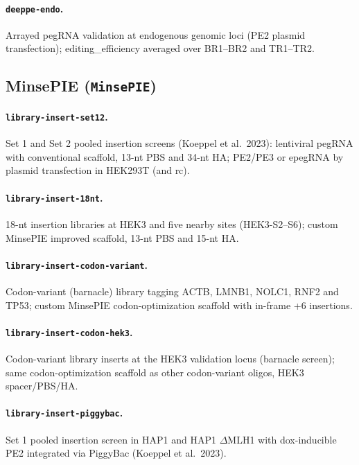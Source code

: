 \documentclass{article}
\begin{document}
\paragraph{\nolinkurl{deeppe-endo}.}
Arrayed pegRNA validation at endogenous genomic loci (PE2 plasmid transfection); editing\_efficiency averaged over BR1--BR2 and TR1--TR2.

\subsection{MinsePIE (\texorpdfstring{\nolinkurl{MinsePIE}}{MinsePIE})}

\paragraph{\nolinkurl{library-insert-set12}.}
Set 1 and Set 2 pooled insertion screens (Koeppel et al.\ 2023): lentiviral pegRNA with conventional scaffold, 13-nt PBS and 34-nt HA; PE2/PE3 or epegRNA by plasmid transfection in HEK293T (and rc).

\paragraph{\nolinkurl{library-insert-18nt}.}
18-nt insertion libraries at HEK3 and five nearby sites (HEK3-S2--S6); custom MinsePIE improved scaffold, 13-nt PBS and 15-nt HA.

\paragraph{\nolinkurl{library-insert-codon-variant}.}
Codon-variant (barnacle) library tagging ACTB, LMNB1, NOLC1, RNF2 and TP53; custom MinsePIE codon-optimization scaffold with in-frame +6 insertions.

\paragraph{\nolinkurl{library-insert-codon-hek3}.}
Codon-variant library inserts at the HEK3 validation locus (barnacle screen); same codon-optimization scaffold as other codon-variant oligos, HEK3 spacer/PBS/HA.

\paragraph{\nolinkurl{library-insert-piggybac}.}
Set 1 pooled insertion screen in HAP1 and HAP1 $\Delta$MLH1 with dox-inducible PE2 integrated via PiggyBac (Koeppel et al.\ 2023).
\end{document}
